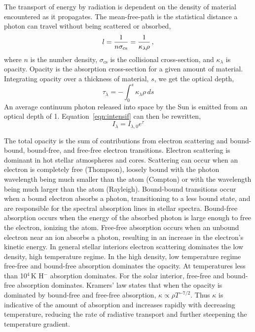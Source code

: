 The transport of energy by radiation is dependent on the density of material encountered as it propagates.
The mean-free-path is the statistical distance a photon can travel without being scattered or absorbed,
\begin{equation}
l = \frac{1}{n \sigma_\mathrm{cs}} = \frac{1}{\kappa_{\lambda} \rho} \mbox{\,,}
\end{equation}
where $n$ is the number density, $\sigma_\mathrm{cs}$ is the collisional cross-section, and $\kappa_{\lambda}$ is opacity.
Opacity is the absorption cross-section for a given amount of material. Integrating opacity over a thickness of material, $s$, we get the optical depth,
\begin{equation}
\tau_{\lambda} = -\int_0^s \kappa_\lambda \rho\,ds %
\end{equation}
An average continuum photon released into space by the Sun is emitted from an optical depth of 1.
Equation~\ref{eqn:intensif} can then be rewritten,
\begin{equation}
I_\lambda = I_{\lambda,0} e^{\tau} %
\end{equation}

The total opacity is the sum of contributions from electron scattering and bound-bound, bound-free, and free-free electron transitions. Electron scattering is dominant in hot stellar atmospheres and cores. Scattering can occur when an electron is completely free (Thompson), loosely bound with the photon wavelength being much smaller than the atom (Compton) or with the wavelength being much larger than the atom (Rayleigh). Bound-bound transitions occur when a bound electron absorbs a photon, transitioning to a less bound state, and are responsible for the spectral absorption lines in stellar spectra. Bound-free absorption occurs when the energy of the absorbed photon is large enough to free the electron, ionizing the atom. Free-free absorption occurs when an unbound electron near an ion absorbs a photon, resulting in an increase in the electron's kinetic energy. %
In general stellar interiors electron scattering dominates the low density, high temperature regime. In the high density, low temperature regime free-free and bound-free absorption dominates the opacity. At temperatures less than 10$^4$\,K H$^-$ absorption dominates. For the solar interior, free-free and bound-free absorption dominates.
Kramers' law states that when the opacity is dominated by bound-free and free-free absorption, $\kappa \propto \rho T^{-7/2}$. Thus $\kappa$ is indicative of the amount of absorption and increases rapidly with decreasing temperature, reducing the rate of radiative transport and further steepening the temperature gradient.

